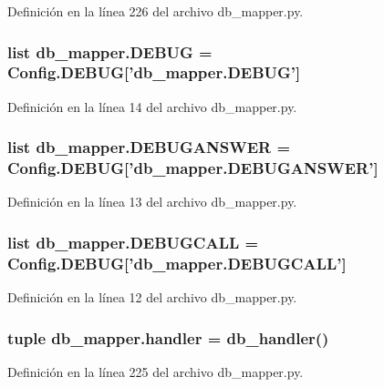 Definición en la línea 226 del archivo db\-\_\-mapper.\-py.

\hypertarget{namespacedb__mapper_aa9453ef6afc547acd4f4a36807754062}{
\subsubsection[{D\-E\-B\-U\-G}]{\setlength{\rightskip}{0pt plus 5cm}list db\-\_\-mapper.\-D\-E\-B\-U\-G = Config.\-D\-E\-B\-U\-G\mbox{[}'db\-\_\-mapper.\-D\-E\-B\-U\-G'\mbox{]}}}\label{namespacedb__mapper_aa9453ef6afc547acd4f4a36807754062}


Definición en la línea 14 del archivo db\-\_\-mapper.\-py.

\hypertarget{namespacedb__mapper_ae8d592e42c99e3b40554e619dfd7eda4}{
\subsubsection[{D\-E\-B\-U\-G\-A\-N\-S\-W\-E\-R}]{\setlength{\rightskip}{0pt plus 5cm}list db\-\_\-mapper.\-D\-E\-B\-U\-G\-A\-N\-S\-W\-E\-R = {\bf Config.\-D\-E\-B\-U\-G}\mbox{[}'db\-\_\-mapper.\-D\-E\-B\-U\-G\-A\-N\-S\-W\-E\-R'\mbox{]}}}\label{namespacedb__mapper_ae8d592e42c99e3b40554e619dfd7eda4}


Definición en la línea 13 del archivo db\-\_\-mapper.\-py.

\hypertarget{namespacedb__mapper_a75634fff7a64aeaac74ca5b779941a79}{
\subsubsection[{D\-E\-B\-U\-G\-C\-A\-L\-L}]{\setlength{\rightskip}{0pt plus 5cm}list db\-\_\-mapper.\-D\-E\-B\-U\-G\-C\-A\-L\-L = {\bf Config.\-D\-E\-B\-U\-G}\mbox{[}'db\-\_\-mapper.\-D\-E\-B\-U\-G\-C\-A\-L\-L'\mbox{]}}}\label{namespacedb__mapper_a75634fff7a64aeaac74ca5b779941a79}


Definición en la línea 12 del archivo db\-\_\-mapper.\-py.

\hypertarget{namespacedb__mapper_a7244272b434d7f40820b6eed3a0d7462}{
\subsubsection[{handler}]{\setlength{\rightskip}{0pt plus 5cm}tuple db\-\_\-mapper.\-handler = {\bf db\-\_\-handler}()}}\label{namespacedb__mapper_a7244272b434d7f40820b6eed3a0d7462}


Definición en la línea 225 del archivo db\-\_\-mapper.\-py.

